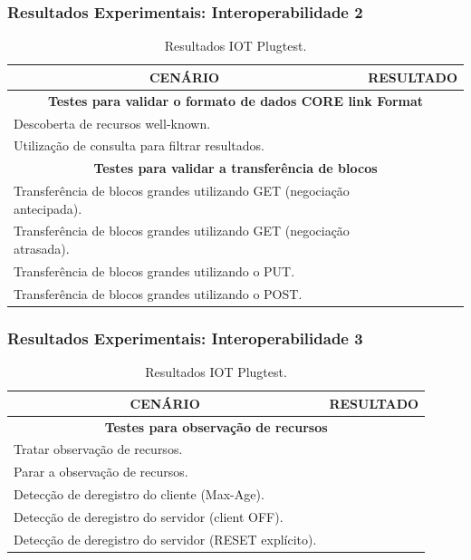 \documentclass{beamer}
\newcommand{\xmark}{{\color{red}\ding{55}}}%
\begin{document}
\begin{frame}
\frametitle{Resultados Experimentais: Interoperabilidade 2}
\begin{table}[H]
\centering
\scriptsize
\label{plugTest}
\begin{tabular}{p{8cm}|c{1cm}}
\hline
\multicolumn{1}{c|}{\textbf{CEN\'ARIO}} & \multicolumn{1}{c}{\textbf{RESULTADO}} \\ \hline
\multicolumn{2}{c}{\bfseries{Testes para validar o formato de dados CORE link Format}} \\ \hline
Descoberta de recursos well-known. & \xmark \\
Utiliza\c{c}\~ao de consulta para filtrar resultados. & \xmark \\ \hline
\multicolumn{2}{c}{\bfseries{Testes para validar a transfer\^encia de blocos}}\\ \hline
Transfer\^encia de blocos grandes utilizando GET (negocia\c{c}\~ao antecipada). & \xmark \\
Transfer\^encia de blocos grandes utilizando GET (negocia\c{c}\~ao atrasada). & \xmark \\
Transfer\^encia de blocos grandes utilizando o PUT. & \xmark \\
Transfer\^encia de blocos grandes utilizando o POST. & \xmark \\ \hline
\end{tabular}
\caption{Resultados IOT Plugtest.}
\end{table}
\end{frame}

\begin{frame}
\frametitle{Resultados Experimentais: Interoperabilidade 3}

\begin{table}[H]
\centering
\scriptsize
\label{plugTest}
\begin{tabular}{p{8cm}|c{1cm}}
\hline
\multicolumn{1}{c|}{\textbf{CEN\'ARIO}} & \multicolumn{1}{c}{\textbf{RESULTADO}} \\ \hline
\multicolumn{2}{c}{\bfseries{Testes para observa\c{c}\~ao de recursos}} \\ \hline
Tratar observa\c{c}\~ao de recursos. & \xmark \\
Parar a observa\c{c}\~ao de recursos. & \xmark \\
Detec\c{c}\~ao de deregistro do cliente (Max-Age). & \xmark \\
Detec\c{c}\~ao de deregistro do servidor (client OFF). & \xmark \\
Detec\c{c}\~ao de deregistro do servidor (RESET expl\'icito). & \xmark \\ \hline
\end{tabular}
\caption{Resultados IOT Plugtest.}
\end{table}
\end{frame}
\end{document}
